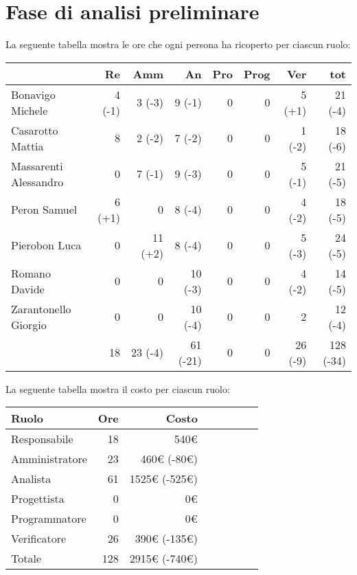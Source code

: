 \section{Fase di analisi preliminare}

La seguente tabella mostra le ore che ogni persona ha ricoperto per ciascun ruolo:

\begin{table}[ht]
    \begin{tabularx}{\linewidth}{X|rrrrrrr}
    \rowcolor{gray!30}& Re & Amm & An & Pro & Prog & Ver & tot \\
    \hline
    Bonavigo Michele                        & 4 (-1) & 3 (-3) & 9 (-1) & 0 & 0 & 5 (+1) & 21 (-4) \\
    \rowcolor{gray!10}Casarotto Mattia      & 8 & 2 (-2) & 7 (-2) & 0 & 0 & 1 (-2) & 18 (-6) \\
    Massarenti Alessandro                   & 0 & 7 (-1) & 9 (-3) & 0 & 0 & 5 (-1) & 21 (-5) \\
    \rowcolor{gray!10}Peron Samuel          & 6 (+1) & 0 & 8 (-4) & 0 & 0 & 4 (-2) & 18 (-5) \\
    Pierobon Luca                           & 0 & 11 (+2) & 8 (-4) & 0 & 0 & 5 (-3) & 24 (-5) \\
    \rowcolor{gray!10}Romano Davide         & 0 & 0 & 10 (-3) & 0 & 0 & 4 (-2) & 14 (-5) \\
    Zarantonello Giorgio                    & 0 & 0 & 10 (-4) & 0 & 0 & 2 & 12 (-4) \\
    \hline                                  & 18 & 23 (-4) & 61 (-21) & 0 & 0 & 26 (-9) & 128 (-34)\\ 
    \end{tabularx}
\end{table}

La seguente tabella mostra il costo per ciascun ruolo:
\begin{table}[ht]
    \begin{tabularx}{\linewidth}{X|rrrrrrr}
    \rowcolor{gray!30}Ruolo & Ore & Costo \\
    \hline
    Responsabile                            & 18 & 540€ \\
    \rowcolor{gray!10}Amministratore        & 23 & 460€ (-80€) \\
    Analista                                & 61 & 1525€ (-525€)\\
    \rowcolor{gray!10}Progettista           & 0 & 0€ \\
    Programmatore                           & 0 & 0€ \\
    \rowcolor{gray!10}Verificatore          & 26 & 390€ (-135€) \\
    \hline Totale                           & 128 & 2915€ (-740€) \\ 
    \end{tabularx}
\end{table}

